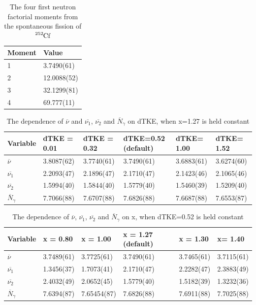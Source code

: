 \documentclass[]{article}
\begin{document}
\begin{table} [H]
	\centering
	\caption{The four first neutron factorial moments from the spontaneous fission of $\ce{^{252}Cf}$}
	\begin{tabularx}{\textwidth}{XX} \hline
		\label{tab:Cf252_n_moments}
		Moment & Value \\ \hline
		1 & 3.7490(61) \\
		2 & 12.0088(52)\\
		3 & 32.1299(81)\\
		4 & 69.777(11)\\ 
	\end{tabularx}
\end{table}

\begin{table} [H]
	\centering
	\caption{The dependence of $\overline{\nu}$  and $\overline{\nu_1}$, $\overline{\nu_2}$ and $\overline{N}_{\gamma}$ on dTKE, when x=1.27 is held constant}
	\begin{tabularx}{\textwidth}{XXXXXX} \hline
		\label{tab:dependence_on_dTKE}
		Variable & dTKE = 0.01&dTKE = 0.32 &dTKE=0.52 (default) & dTKE= 1.00 & dTKE= 1.52\\ \hline
		$\overline{\nu}$ & 3.8087(62) & 3.7740(61) & 3.7490(61) & 3.6883(61) & 3.6274(60)\\
		$\overline{\nu_1}$ & 2.2093(47) & 2.1896(47)  & 2.1710(47)& 2.1423(46) & 2.1065(46) \\
		$\overline{\nu_2}$ & 1.5994(40) &1.5844(40) & 1.5779(40) & 1.5460(39) &  1.5209(40)\\ 
		$\overline{N}_{\gamma}$ & 7.7066(88) & 7.6707(88) & 7.6826(88) & 7.6687(88) & 7.6553(87)\\
		\hline
	\end{tabularx}
\end{table}

\begin{table} [H]
	\centering
	\caption{The dependence of $\overline{\nu}$, $\overline{\nu_1}$, $\overline{\nu_2}$ and $\overline{N}_{\gamma}$ on x, when dTKE=0.52 is held constant}
	\begin{tabularx}{\textwidth}{XXXXXX} \hline
		\label{tab:dependence_on_x}
		Variable & x = 0.80 & x  = 1.00 & x = 1.27 (default) & x = 1.30 & x= 1.40\\ \hline
		$\overline{\nu}$ & 3.7489(61) & 3.7725(61) & 3.7490(61) & 3.7465(61) & 3.7115(61)\\
		$\overline{\nu_1}$ & 1.3456(37) & 1.7073(41)  & 2.1710(47) & 2.2282(47) & 2.3883(49) \\
		$\overline{\nu_2}$ & 2.4032(49)  & 2.0652(45) & 1.5779(40) & 1.5182(39) & 1.3232(36) \\ 
		$\overline{N}_{\gamma}$ & 7.6394(87) & 7.65454(87) & 7.6826(88) & 7.6911(88) & 7.7025(88)\\
		\hline
	\end{tabularx}
\end{table}
\end{document}
